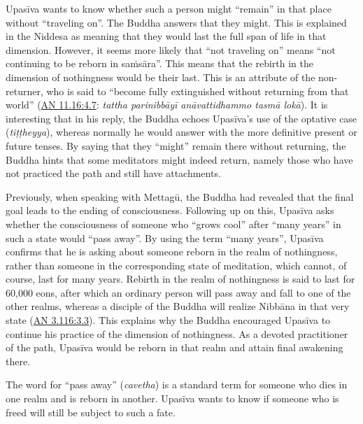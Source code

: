 \documentclass[12pt,openany]{book}%
\begin{document}
\textsanskrit{Upasīva} wants to know whether such a person might “remain” in that place without “traveling on”. The Buddha answers that they might. This is explained in the Niddesa as meaning that they would last the full span of life in that dimension. However, it seems more likely that “not traveling on” means “not continuing to be reborn in \textsanskrit{saṁsāra}”. This means that the rebirth in the dimension of nothingness would be their last. This is an attribute of the non-returner, who is said to “become fully extinguished without returning from that world” (\href{https://suttacentral.net/an11.16/en/sujato\#4.7}{AN 11.16:4.7}:  \textit{tattha \textsanskrit{parinibbāyī} \textsanskrit{anāvattidhammo} \textsanskrit{tasmā} \textsanskrit{lokā}}). It is interesting that in his reply, the Buddha echoes \textsanskrit{Upasīva}’s use of the optative case (\textit{\textsanskrit{tiṭṭheyya}}), whereas normally he would answer with the more definitive present or future tenses. By saying that they “might” remain there without returning, the Buddha hints that some meditators might indeed return, namely those who have not practiced the path and still have attachments.

Previously, when speaking with \textsanskrit{Mettagū}, the Buddha had revealed that the final goal leads to the ending of consciousness. Following up on this, \textsanskrit{Upasīva} asks whether the consciousness of someone who “grows cool” after “many years” in such a state would “pass away”. By using the term “many years”, \textsanskrit{Upasīva} confirms that he is asking about someone reborn in the realm of nothingness, rather than someone in the corresponding state of meditation, which cannot, of course, last for many years. Rebirth in the realm of nothingness is said to last for 60,000 eons, after which an ordinary person will pass away and fall to one of the other realms, whereas a disciple of the Buddha will realize \textsanskrit{Nibbāna} in that very state (\href{https://suttacentral.net/an3.116/en/sujato\#3.3}{AN 3.116:3.3}). This explains why the Buddha encouraged \textsanskrit{Upasīva} to continue his practice of the dimension of nothingness. As a devoted practitioner of the path, \textsanskrit{Upasīva} would be reborn in that realm and attain final awakening there.

The word for “pass away” (\textit{cavetha}) is a standard term for someone who dies in one realm and is reborn in another. \textsanskrit{Upasīva} wants to know if someone who is freed will still be subject to such a fate.
\end{document}
